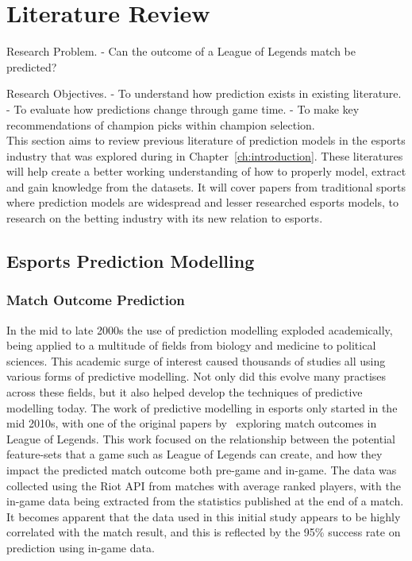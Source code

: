\chapter{Literature Review}\label{ch:literaturereview}
Research Problem.
- Can the outcome of a League of Legends match be predicted?

Research Objectives.
- To understand how prediction exists in existing literature.
- To evaluate how predictions change through game time.
- To make key recommendations of champion picks within champion selection. \\

This section aims to review previous literature of prediction models in the esports industry that was explored during in Chapter~\ref{ch:introduction}.
These literatures will help create a better working understanding of how to properly model, extract and gain knowledge from the datasets.
It will cover papers from traditional sports where prediction models are widespread and lesser researched esports models, to research on the betting industry with its new relation to esports.

\section{Esports Prediction Modelling}\label{sec:EsportsPredictionModelling}
\subsection{Match Outcome Prediction}\label{subsec:Match Outcome Prediction}
In the mid to late 2000s the use of prediction modelling exploded academically, being applied to a multitude of fields from biology and medicine to political sciences.
This academic surge of interest caused thousands of studies all using various forms of predictive modelling.
Not only did this evolve many practises across these fields, but it also helped develop the techniques of predictive modelling today.
The work of predictive modelling in esports only started in the mid 2010s, with one of the original papers by~\citet{lin2016league} exploring match outcomes in League of Legends.
This work focused on the relationship between the potential feature-sets that a game such as League of Legends can create, and how they impact the predicted match outcome both pre-game and in-game.
The data was collected using the Riot API from matches with average ranked players, with the in-game data being extracted from the statistics published at the end of a match.
It becomes apparent that the data used in this initial study appears to be highly correlated with the match result, and this is reflected by the 95\% success rate on prediction using in-game data.


